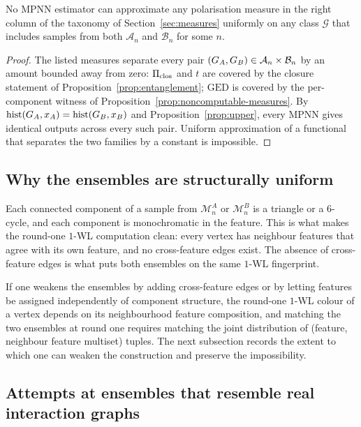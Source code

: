 \begin{corollary}\label{cor:no-closure-mpnn}
No MPNN estimator can approximate any polarisation measure in the
right column of the taxonomy of Section~\ref{sec:measures} uniformly on
any class $\mathcal{G}$ that includes samples from both
$\mathcal{A}_n$ and $\mathcal{B}_n$ for some $n$.
\end{corollary}

\begin{proof}
The listed measures separate every pair $(G_A, G_B) \in
\mathcal{A}_n \times \mathcal{B}_n$ by an amount bounded away from
zero: $\Pi_{\mathrm{clos}}$ and $t$ are covered by the closure statement of
Proposition~\ref{prop:entanglement}; $\mathrm{GED}$ is covered by the
per-component witness of Proposition~\ref{prop:noncomputable-measures}. By $\mathrm{hist}(G_A, x_A) =
\mathrm{hist}(G_B, x_B)$ and Proposition~\ref{prop:upper}, every MPNN gives
identical outputs across every such pair. Uniform approximation of
a functional that separates the two families by a constant is
impossible.
\end{proof}

\subsection{Why the ensembles are structurally uniform}

Each connected component of a sample from $\mathcal{M}_n^A$ or
$\mathcal{M}_n^B$ is a triangle or a $6$-cycle, and each component is
monochromatic in the feature. This is what makes the round-one $1$-WL
computation clean: every vertex has neighbour features that agree with
its own feature, and no cross-feature edges exist. The absence of
cross-feature edges is what puts both ensembles on the same $1$-WL
fingerprint.

If one weakens the ensembles by adding cross-feature edges or by
letting features be assigned independently of component structure, the
round-one $1$-WL colour of a vertex depends on its neighbourhood
feature composition, and matching the two ensembles at round one
requires matching the joint distribution of (feature, neighbour
feature multiset) tuples. The next subsection records the extent to
which one can weaken the construction and preserve the impossibility.

\subsection{Attempts at ensembles that resemble real
interaction graphs}\label{sec:obstacle}

